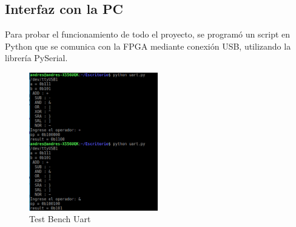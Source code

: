 \documentclass[a4paper]{article}
\begin{document}
\subsection{Interfaz con la PC}
Para probar el funcionamiento de todo el proyecto, se programó un script en Python que se comunica con la FPGA mediante conexión USB, utilizando la librería PySerial.
\begin{figure}[!htb]
\centering
\includegraphics[width=0.5\textwidth]{resultado.png}
\caption{\label{fig:tests}Test Bench Uart}
\end{figure}
\end{document}
